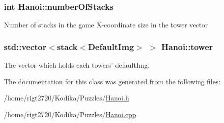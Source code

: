 \hypertarget{classHanoi_abcdaa5a4b56f9c3916bf49e054e1cf8c}{
\subsubsection[{number\-Of\-Stacks}]{\setlength{\rightskip}{0pt plus 5cm}int Hanoi\-::number\-Of\-Stacks\hspace{0.3cm}{\ttfamily [private]}}}\label{classHanoi_abcdaa5a4b56f9c3916bf49e054e1cf8c}
Number of stacks in the game X-\/coordinate size in the tower vector \hypertarget{classHanoi_afe67c656c8ce8c7006e8b7f23fbe9ae9}{
\subsubsection[{tower}]{\setlength{\rightskip}{0pt plus 5cm}std\-::vector$<$stack$<${\bf Default\-Img}$>$ $>$ Hanoi\-::tower\hspace{0.3cm}{\ttfamily [private]}}}\label{classHanoi_afe67c656c8ce8c7006e8b7f23fbe9ae9}


The vector which holds each towers' default\-Img. 



The documentation for this class was generated from the following files\-:\begin{DoxyCompactItemize}
\item 
/home/rigt2720/\-Kodika/\-Puzzles/\hyperlink{Hanoi_8h}{Hanoi.\-h}\item 
/home/rigt2720/\-Kodika/\-Puzzles/\hyperlink{Hanoi_8cpp}{Hanoi.\-cpp}\end{DoxyCompactItemize}
